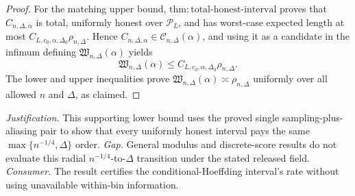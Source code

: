 \documentclass{article}
\begin{document}
\begin{proof}
For the matching upper bound, \(\mathrm{thm:total\text{-}honest\text{-}interval}\) proves that \(C_{n,\Delta,\alpha}\) is total, uniformly honest over \(\mathcal P_L\), and has worst-case expected length at most \(C_{L,c_0,\alpha,\Delta_0}\rho_{n,\Delta}\).  Hence \(C_{n,\Delta,\alpha}\in\mathcal C_{n,\Delta}(\alpha)\), and using it as a candidate in the infimum defining \(\mathfrak W_{n,\Delta}(\alpha)\) yields
\[
 \mathfrak W_{n,\Delta}(\alpha)
 \leq C_{L,c_0,\alpha,\Delta_0}\rho_{n,\Delta}.
\]
The lower and upper inequalities prove \(\mathfrak W_{n,\Delta}(\alpha)\asymp\rho_{n,\Delta}\) uniformly over all allowed \(n\) and \(\Delta\), as claimed.
\end{proof}
\par\smallskip\noindent \textit{Justification.} This supporting lower bound uses the proved single sampling-plus-aliasing pair to show that every uniformly honest interval pays the same \(\max\{n^{-1/4},\Delta\}\) order. \textit{Gap.} General modulus and discrete-score results do not evaluate this radial \(n^{-1/4}\)-to-\(\Delta\) transition under the stated released field. \textit{Consumer.} The result certifies the conditional-Hoeffding interval's rate without using unavailable within-bin information.
\end{document}
